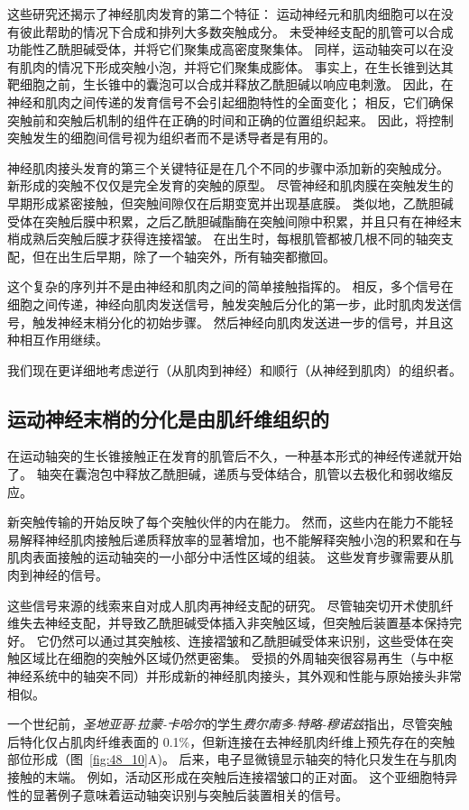这些研究还揭示了神经肌肉发育的第二个特征：
运动神经元和肌肉细胞可以在没有彼此帮助的情况下合成和排列大多数突触成分。
未受神经支配的肌管可以合成功能性乙酰胆碱受体，并将它们聚集成高密度聚集体。
同样，运动轴突可以在没有肌肉的情况下形成突触小泡，并将它们聚集成膨体。
事实上，在生长锥到达其靶细胞之前，生长锥中的囊泡可以合成并释放乙酰胆碱以响应电刺激。
因此，在神经和肌肉之间传递的发育信号不会引起细胞特性的全面变化；
相反，它们确保突触前和突触后机制的组件在正确的时间和正确的位置组织起来。
因此，将控制突触发生的细胞间信号视为组织者而不是诱导者是有用的。


神经肌肉接头发育的第三个关键特征是在几个不同的步骤中添加新的突触成分。
新形成的突触不仅仅是完全发育的突触的原型。
尽管神经和肌肉膜在突触发生的早期形成紧密接触，但突触间隙仅在后期变宽并出现基底膜。
类似地，乙酰胆碱受体在突触后膜中积累，之后乙酰胆碱酯酶在突触间隙中积累，并且只有在神经末梢成熟后突触后膜才获得连接褶皱。
在出生时，每根肌管都被几根不同的轴突支配，但在出生后早期，除了一个轴突外，所有轴突都撤回。


这个复杂的序列并不是由神经和肌肉之间的简单接触指挥的。 
相反，多个信号在细胞之间传递，神经向肌肉发送信号，触发突触后分化的第一步，此时肌肉发送信号，触发神经末梢分化的初始步骤。
然后神经向肌肉发送进一步的信号，并且这种相互作用继续。


我们现在更详细地考虑逆行（从肌肉到神经）和顺行（从神经到肌肉）的组织者。



\subsection{运动神经末梢的分化是由肌纤维组织的}


在运动轴突的生长锥接触正在发育的肌管后不久，一种基本形式的神经传递就开始了。
轴突在囊泡包中释放乙酰胆碱，递质与受体结合，肌管以去极化和弱收缩反应。


新突触传输的开始反映了每个突触伙伴的内在能力。
然而，这些内在能力不能轻易解释神经肌肉接触后递质释放率的显著增加，也不能解释突触小泡的积累和在与肌肉表面接触的运动轴突的一小部分中活性区域的组装。
这些发育步骤需要从肌肉到神经的信号。


这些信号来源的线索来自对成人肌肉再神经支配的研究。
尽管轴突切开术使肌纤维失去神经支配，并导致乙酰胆碱受体插入非突触区域，但突触后装置基本保持完好。
它仍然可以通过其突触核、连接褶皱和乙酰胆碱受体来识别，这些受体在突触区域比在细胞的突触外区域仍然更密集。
受损的外周轴突很容易再生（与中枢神经系统中的轴突不同）并形成新的神经肌肉接头，其外观和性能与原始接头非常相似。


一个世纪前，\textit{圣地亚哥$\cdot$拉蒙-卡哈尔}的学生\textit{费尔南多$\cdot$特略-穆诺兹}指出，尽管突触后特化仅占肌肉纤维表面的 0.1\%，但新连接在去神经肌肉纤维上预先存在的突触部位形成（图~\ref{fig:48_10}A)。
后来，电子显微镜显示轴突的特化只发生在与肌肉接触的末端。
例如，活动区形成在突触后连接褶皱口的正对面。
这个亚细胞特异性的显著例子意味着运动轴突识别与突触后装置相关的信号。


